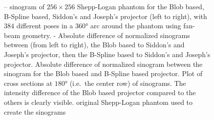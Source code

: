 \begin{figure}[h]
	\caption{-- sinogram of \(256 \times
		256\) Shepp-Logan phantom for the Blob based, B-Spline based, Siddon's and Joseph's
		projector (left to right), with \(384\) different poses in a \(360\)° arc around the
		phantom using fan-beam geometry.%
		- Absolute
		difference of normalized sinograms between (from left to right), the Blob based to
		Siddon's and Joseph's projector, then the B-Spline based to Siddon's and Joseph's
		projector.  Absolute difference of normalized
		sinogram between the sinogram for the Blob based and B-Spline based projector.%
		 Plot of cross sections at \(180\)° (i.e.\ the
		center row) of sinograms. The intensity difference of the Blob based projector
		compared to the others is clearly visible.  original
		Shepp-Logan phantom used to create the sinograms}%
	\label{fig:sinogram_shepp_logan}
\end{figure}

